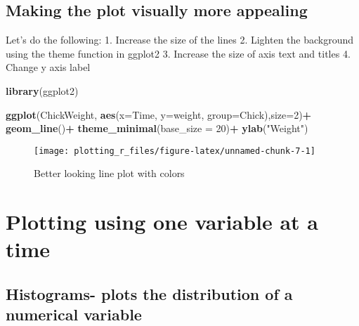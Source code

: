 \documentclass[
]{book}
\newenvironment{Shaded}{\begin{snugshade}}{\end{snugshade}}
\newcommand{\DataTypeTok}[1]{\textcolor[rgb]{0.13,0.29,0.53}{#1}}
\newcommand{\DecValTok}[1]{\textcolor[rgb]{0.00,0.00,0.81}{#1}}
\newcommand{\KeywordTok}[1]{\textcolor[rgb]{0.13,0.29,0.53}{\textbf{#1}}}
\newcommand{\NormalTok}[1]{#1}
\newcommand{\OperatorTok}[1]{\textcolor[rgb]{0.81,0.36,0.00}{\textbf{#1}}}
\newcommand{\StringTok}[1]{\textcolor[rgb]{0.31,0.60,0.02}{#1}}
\begin{document}
\hypertarget{making-the-plot-visually-more-appealing}{%
\section{Making the plot visually more appealing}\label{making-the-plot-visually-more-appealing}}

Let's do the following:
1. Increase the size of the lines
2. Lighten the background using the theme function in ggplot2
3. Increase the size of axis text and titles
4. Change y axis label

\begin{Shaded}
\begin{Highlighting}[]
\KeywordTok{library}\NormalTok{(ggplot2)}

\KeywordTok{ggplot}\NormalTok{(ChickWeight, }\KeywordTok{aes}\NormalTok{(}\DataTypeTok{x=}\NormalTok{Time, }\DataTypeTok{y=}\NormalTok{weight, }\DataTypeTok{group=}\NormalTok{Chick),}\DataTypeTok{size=}\DecValTok{2}\NormalTok{)}\OperatorTok{+}
\StringTok{  }\KeywordTok{geom_line}\NormalTok{()}\OperatorTok{+}
\StringTok{  }\KeywordTok{theme_minimal}\NormalTok{(}\DataTypeTok{base_size =} \DecValTok{20}\NormalTok{)}\OperatorTok{+}
\StringTok{  }\KeywordTok{ylab}\NormalTok{(}\StringTok{"Weight"}\NormalTok{)}
\end{Highlighting}
\end{Shaded}

\begin{figure}

{\centering \texttt{[image: plotting\_r\_files/figure-latex/unnamed-chunk-7-1]} 

}

\caption{Better looking line plot with colors}\label{fig:unnamed-chunk-7}
\end{figure}

\hypertarget{plotting-using-one-variable-at-a-time}{%
\chapter{Plotting using one variable at a time}\label{plotting-using-one-variable-at-a-time}}

\hypertarget{histograms--plots-the-distribution-of-a-numerical-variable}{%
\section{Histograms- plots the distribution of a numerical variable}\label{histograms--plots-the-distribution-of-a-numerical-variable}}
\end{document}
